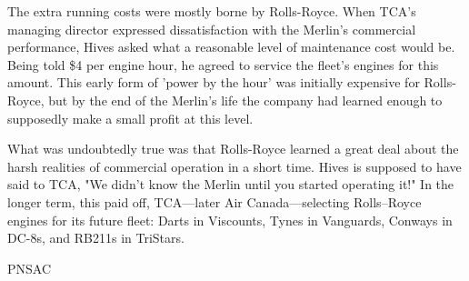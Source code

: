 The extra running costs were mostly borne by Rolls-Royce. When TCA's
managing director expressed dissatisfaction with the Merlin's
commercial performance, Hives asked what a reasonable level of
maintenance cost would be. Being told \$4 per engine hour, he agreed to
service the fleet's engines for this amount. This early form of 'power
by the hour' was initially expensive for Rolls-Royce, but by the end of
the Merlin's life the company had learned enough to supposedly make a
small profit at this level.

What was undoubtedly true was that Rolls-Royce learned a great deal
about the harsh realities of commercial operation in a short time.
Hives is supposed to have said to TCA, "We didn't know the Merlin until
you started operating it!" In the longer term, this paid off,
TCA---later Air Canada---selecting Rolls--Royce engines for its future
fleet: Darts in Viscounts, Tynes in Vanguards, Conways in DC-8s, and
RB211s in TriStars.


\begin{footnotesize} \raggedleft PNSAC\\
\end{footnotesize}



